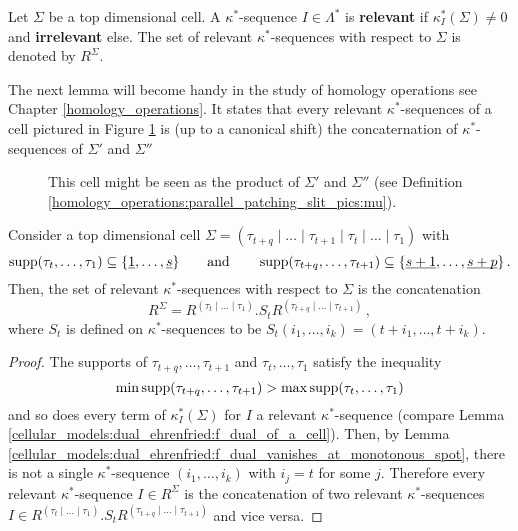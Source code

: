 \begin{defi}
    \label{cellular_models:dual_ehrenfried:relevant_kappa_dual_sequences}
    Let $\Sigma$ be a top dimensional cell.
    A $\kappa^\ast$-sequence $I \in \Lambda^\ast$ is {\bf relevant} if $\kappa^\ast_I(\Sigma) \neq 0$ and {\bf irrelevant} else.
    The set of relevant $\kappa^\ast$-sequences with respect to $\Sigma$ is denoted by $R^\Sigma$.
\end{defi}

The next lemma will become handy in the study of homology operations see Chapter \ref{homology_operations}.
It states that every relevant $\kappa^\ast$-sequences of a cell pictured in Figure \ref{cellular_models:dual_ehrenfried:motivate_lemma_for_multiplication}
is (up to a canonical shift) the concaternation of $\kappa^\ast$-sequences of $\Sigma'$ and $\Sigma''$
\begin{figure}[ht]
\centering
{}
\caption{\label{cellular_models:dual_ehrenfried:motivate_lemma_for_multiplication}This cell might be seen as the product of $\Sigma'$ and $\Sigma''$ (see Definition \ref{homology_operations:parallel_patching_slit_pics:mu}).}
\end{figure}

\begin{lem}
    \label{cellular_models:dual_ehrenfried:relevant_kappa_dual_sequences_of_blocks}
    Consider a top dimensional cell $\Sigma = (\tau_{t+q} \mid \ldots \mid \tau_{t+1} \mid \tau_t \mid \ldots \mid \tau_1)$ with
    \[
        \supp(\tau_t, \ldots, \tau_1) \subseteq \{ \ul 1, \ldots, \ul s \} \mspc{and}{20} \supp(\tau_{t+q}, \ldots, \tau_{t+1}) \subseteq \{ \ul{s+1}, \ldots, \ul{s+p} \} \,.
    \]
    Then, the set of relevant $\kappa^\ast$-sequences with respect to $\Sigma$ is the concatenation
    \[
        R^\Sigma = R^{(\tau_t \mid \ldots \mid \tau_1)}.S_tR^{(\tau_{t+q} \mid \ldots \mid \tau_{t+1})} \,,
    \]
    where $S_t$ is defined on $\kappa^\ast$-sequences to be $S_t( i_1, \ldots, i_k ) = (t+i_1, \ldots, t+i_k)$.
\end{lem}

\begin{proof}
    The supports of $\tau_{t+q}, \ldots, \tau_{t+1}$ and $\tau_t, \ldots, \tau_1$ satisfy the inequality
    \[
         \min\supp(\tau_{t+q}, \ldots, \tau_{t+1})  > \max\supp(\tau_t, \ldots, \tau_1)
    \]
    and so does every term of $\kappa^\ast_I (\Sigma)$ for $I$ a relevant $\kappa^\ast$-sequence (compare Lemma \ref{cellular_models:dual_ehrenfried:f_dual_of_a_cell}).
    Then, by Lemma \ref{cellular_models:dual_ehrenfried:f_dual_vanishes_at_monotonous_spot}, there is not a single $\kappa^\ast$-sequence $(i_1, \ldots, i_k)$ with $i_j = t$ for some $j$.
    Therefore every relevant $\kappa^\ast$-sequence $I \in R^\Sigma$ is the concatenation of two relevant $\kappa^\ast$-sequences $I \in R^{(\tau_t \mid \ldots \mid \tau_1)}.S_tR^{(\tau_{t+q} \mid \ldots \mid \tau_{t+1})}$ and vice versa.
\end{proof}
